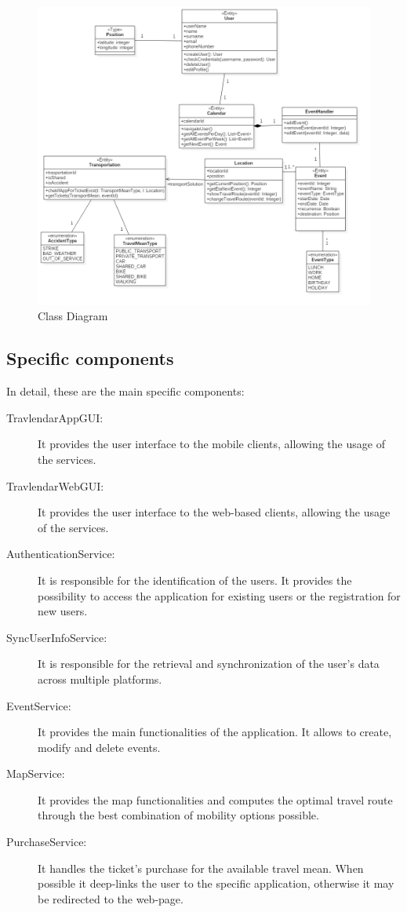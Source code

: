 \begin{figure}
	\centering
	\includegraphics[width=6in]{./diagrams/ClassDiagram.png}
	\caption{Class Diagram}
	\label{fig:seqLogin}
\end{figure}

\subsection*{Specific components}
In detail, these are the main specific components:
\begin{description}
	\item[TravlendarAppGUI:] It provides the user interface to the mobile clients, allowing the usage of the services.
	\item[TravlendarWebGUI:] It provides the user interface to the web-based clients, allowing the usage of the services.
	\item[AuthenticationService:] It is responsible for the identification of the users. It provides the possibility to access the application for existing users or the registration for new users.
	\item[SyncUserInfoService:] It is responsible for the retrieval and synchronization of the user's data across multiple platforms.
	\item[EventService:] It provides the main functionalities of the application. It allows to create, modify and delete events.
	\item[MapService:] It provides the map functionalities and computes the optimal travel route through the best combination of mobility options possible.
	\item[PurchaseService:] It handles the ticket's purchase for the available travel mean. When possible it deep-links the user to the specific application, otherwise it may be redirected to the web-page.
\end{description}

